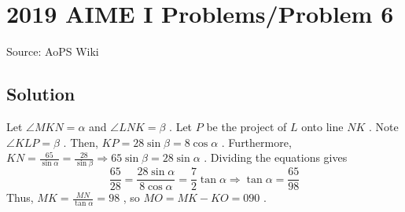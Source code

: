 \documentclass[12pt]{article}
\begin{document}
\section*{{2019 AIME I Problems/Problem 6}}
Source: AoPS Wiki

\subsection*{Solution}
Let $\angle MKN=\alpha$ and $\angle LNK=\beta$ . Let $P$ be the project of $L$ onto line $NK$ . Note $\angle KLP=\beta$ . Then, $KP=28\sin\beta=8\cos\alpha$ .
Furthermore, $KN=\frac{65}{\sin\alpha}=\frac{28}{\sin\beta} \Rightarrow 65\sin\beta=28\sin\alpha$ . Dividing the equations gives \[\frac{65}{28}=\frac{28\sin\alpha}{8\cos\alpha}=\frac{7}{2}\tan\alpha\Rightarrow \tan\alpha=\frac{65}{98}\] Thus, $MK=\frac{MN}{\tan\alpha}=98$ , so $MO=MK-KO=\boxed{090}$ .
\end{document}
